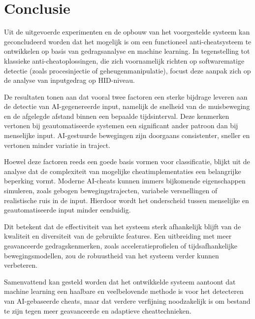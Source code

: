 
\chapter{Conclusie}%
\label{ch:conclusie}


Uit de uitgevoerde experimenten en de opbouw van het voorgestelde systeem kan geconcludeerd worden dat het mogelijk is om een functioneel anti-cheatsysteem te ontwikkelen op basis van gedragsanalyse en machine learning. In tegenstelling tot klassieke anti-cheatoplossingen, die zich voornamelijk richten op softwarematige detectie (zoals procesinjectie of geheugenmanipulatie), focust deze aanpak zich op de analyse van inputgedrag op HID-niveau.

De resultaten tonen aan dat vooral twee factoren een sterke bijdrage leveren aan de detectie van AI-gegenereerde input, namelijk de snelheid van de muisbeweging en de afgelegde afstand binnen een bepaalde tijdsinterval. Deze kenmerken vertonen bij geautomatiseerde systemen een significant ander patroon dan bij menselijke input. AI-gestuurde bewegingen zijn doorgaans consistenter, sneller en vertonen minder variatie in traject.

Hoewel deze factoren reeds een goede basis vormen voor classificatie, blijkt uit de analyse dat de complexiteit van mogelijke cheatimplementaties een belangrijke beperking vormt. Moderne AI-cheats kunnen immers bijkomende eigenschappen simuleren, zoals gebogen bewegingstrajecten, variabele versnellingen of realistische ruis in de input. Hierdoor wordt het onderscheid tussen menselijke en geautomatiseerde input minder eenduidig.

Dit betekent dat de effectiviteit van het systeem sterk afhankelijk blijft van de kwaliteit en diversiteit van de gebruikte features. Een uitbreiding met meer geavanceerde gedragskenmerken, zoals acceleratieprofielen of tijdsafhankelijke bewegingsmodellen, zou de robuustheid van het systeem verder kunnen verbeteren.

Samenvattend kan gesteld worden dat het ontwikkelde systeem aantoont dat machine learning een haalbare en veelbelovende methode is voor het detecteren van AI-gebaseerde cheats, maar dat verdere verfijning noodzakelijk is om bestand te zijn tegen meer geavanceerde en adaptieve cheattechnieken.
